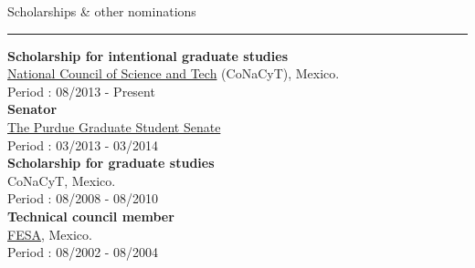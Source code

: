 \documentclass[letterpaper,10pt]{article}
\begin{document}
\begin{minipage}{0.4\textwidth} 
\vspace*{0.5cm}
{\centering \large{Scholarships \& other nominations}} \\
\textcolor{Dandelion}{\rule{0.95\textwidth}{0.05in}}

\textbf{Scholarship for intentional graduate studies} \\
\href{http://www.conacyt.gob.mx}{National Council of Science and Tech} (CoNaCyT),
Mexico. \\
Period : 08/2013 - Present \\

\textbf{Senator} \\
\href{http://web.ics.purdue.edu/~pgsg/}{The Purdue Graduate Student Senate} \\
Period : 03/2013 - 03/2014 \\

\textbf{Scholarship for graduate studies} \\
CoNaCyT,
Mexico. \\
Period : 08/2008 - 08/2010 \\

\textbf{Technical council member} \\
\href{http://consejotecnico.acatlan.unam.mx/}{FESA},
Mexico. \\
Period : 08/2002 - 08/2004
\end{minipage} 



\end{document}

